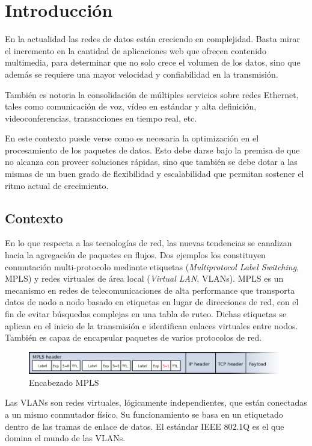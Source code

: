 \chapter{Introducción}

En la actualidad las redes de datos están creciendo en complejidad. Basta mirar el incremento en la cantidad de aplicaciones web que ofrecen contenido multimedia, para determinar que no solo crece el volumen de los datos, sino que además se requiere una mayor velocidad y confiabilidad en la transmisión. 

También es notoria la consolidación de múltiples servicios sobre redes Ethernet, tales como comunicación de voz, vídeo en estándar y alta definición, videoconferencias, transacciones en tiempo real, etc.

En este contexto puede verse como es necesaria la optimización en el procesamiento de los paquetes de datos. Esto debe darse bajo la premisa de que no alcanza con proveer soluciones rápidas, sino que también se debe dotar a las mismas de un buen grado de flexibilidad y escalabilidad que permitan sostener el ritmo actual de crecimiento.



\section{Contexto}


En lo que respecta a las tecnologías de red, las nuevas tendencias se canalizan hacia la agregación de paquetes en flujos. Dos ejemplos los constituyen conmutación multi-protocolo mediante etiquetas (\textit{Multiprotocol Label Switching}, MPLS) y redes virtuales  de área local (\textit{Virtual LAN}, VLANs). MPLS es un mecanismo en redes de telecomunicaciones de alta performance que transporta datos de nodo a nodo basado en etiquetas en lugar de direcciones de red, con el fin de evitar búsquedas complejas en una tabla de ruteo. Dichas etiquetas se aplican en el inicio de la transmisión e identifican enlaces virtuales entre nodos. También es capaz de encapsular paquetes de varios protocolos de red.

\begin{figure}[h]
  \centering
	\includegraphics[width=0.99\textwidth]{1-introduccion/graf/MPLS_packet.eps}
  \caption{Encabezado MPLS}
  \label{fig:flow}
\end{figure}
Las VLANs son redes virtuales, lógicamente independientes, que están conectadas a un mismo conmutador físico. Su funcionamiento se basa en un etiquetado dentro de las tramas de enlace de datos. El estándar IEEE 802.1Q es el que domina el mundo de las VLANs.


